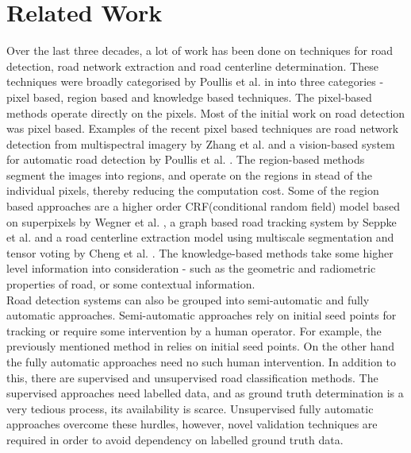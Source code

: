 \documentclass[12pt,twoside]{article}
\theoremstyle{plain}
\theoremstyle{definition}
\theoremstyle{remark}
\newcommand{\forceindent}{\leavevmode{\parindent=2em\indent}}
\begin{document}
\section{Related Work}
\label{sec:relatedwork}
Over the last three decades, a lot of work has been done on techniques for road detection, road network extraction and road centerline determination. These techniques were broadly categorised by Poullis et al. in \cite{Poullis2010} into three categories - pixel based, region based and knowledge based techniques. The pixel-based methods operate directly on the pixels. Most of the initial work on road detection was pixel based. Examples of the recent pixel based techniques are road network detection from multispectral imagery by Zhang et al. \cite{Zhang2006} and a vision-based system for automatic road detection by Poullis et al. \cite{Poullis2010}. The region-based methods segment the images into regions, and operate on the regions in stead of the individual pixels, thereby reducing the computation cost. Some of the region based approaches are a higher order CRF(conditional random field) model based on superpixels by Wegner et al. \cite{Wegner2013}, a graph based road tracking system by Seppke et al. \cite{Seppke2016} and a road centerline extraction model using multiscale segmentation and tensor voting by Cheng et al. \cite{Cheng}. The knowledge-based methods take some higher level information into consideration - such as the geometric and radiometric properties of road, or some contextual information.\\
\forceindent Road detection systems can also be grouped into semi-automatic and fully automatic approaches. Semi-automatic approaches rely on initial seed points for tracking or require some intervention by a human operator. For example, the previously mentioned method in \cite{Seppke2016} relies on initial seed points. On the other hand the fully automatic approaches need no such human intervention. In addition to this, there are supervised and unsupervised road classification methods. The supervised approaches need labelled data, and as ground truth determination is a very tedious process, its availability is scarce. Unsupervised fully automatic approaches overcome these hurdles, however, novel validation techniques are required in order to avoid dependency on labelled ground truth data.\\
\end{document}
